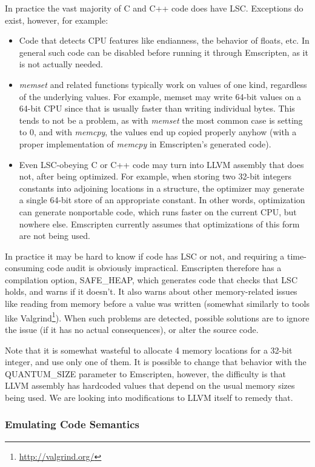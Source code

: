 \documentclass[preprint,10pt]{sigplanconf}
\begin{document}
In practice the vast majority of C and C++ code does have LSC. Exceptions
do exist, however, for example:
\begin{itemize}
\item Code that detects CPU features like endianness, the behavior of floats, etc. In general such code can be disabled
      before running it through Emscripten, as it is not actually needed.
\item \emph{memset} and related functions typically work on values of one kind,
      regardless of the underlying values. For example, memset may write 64-bit
      values on a 64-bit CPU since that is usually faster than writing individual
      bytes. This tends to
      not be a problem, as with \emph{memset} the most common case is setting to
      0, and with \emph{memcpy}, the values end up copied properly anyhow (with
      a proper implementation of \emph{memcpy} in Emscripten's generated code).
\item Even LSC-obeying C or C++ code may turn into LLVM assembly that does not,
      after being optimized. For example, when storing two 32-bit integers constants into
      adjoining locations in a structure, the optimizer may generate a single
      64-bit store of an appropriate constant. In other words, optimization can
      generate nonportable code, which runs faster on the current CPU, but
      nowhere else. Emscripten currently assumes that optimizations of this form
      are not being used.
\end{itemize}
In practice it may be hard to know if code has LSC or not, and requiring
a time-consuming code audit is obviously impractical. Emscripten therefore has
a compilation option, SAFE\_HEAP, which generates code that checks that LSC holds, and warns if it
doesn't. It also warns about other memory-related issues like
reading from memory before a value was written (somewhat similarly to tools
like Valgrind\footnote{\url{http://valgrind.org/}}). When such problems are detected, possible solutions are to ignore the issue (if it has no actual
consequences), or alter the source code.

Note that it is somewhat wasteful to allocate 4 memory locations for
a 32-bit integer, and use only one of them. It is possible to change
that behavior with the QUANTUM\_SIZE parameter to Emscripten, however,
the difficulty is that LLVM assembly has hardcoded values that depend on
the usual memory sizes being used. We are looking into modifications
to LLVM itself to remedy that.

\subsubsection{Emulating Code Semantics}
\label{sssec:realworldcode}
\end{document}
